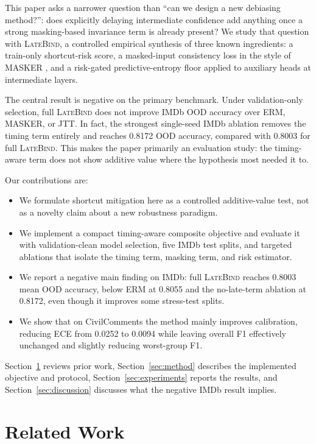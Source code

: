 \documentclass{article}
\newcommand{\LateBind}{\textsc{LateBind}}
\begin{document}
This paper asks a narrower question than ``can we design a new debiasing method?'': does explicitly delaying intermediate confidence add anything once a strong masking-based invariance term is already present? We study that question with \LateBind, a controlled empirical synthesis of three known ingredients: a train-only shortcut-risk score, a masked-input consistency loss in the style of MASKER \citep{moon-etal-2021-masker}, and a risk-gated predictive-entropy floor applied to auxiliary heads at intermediate layers.

The central result is negative on the primary benchmark. Under validation-only selection, full \LateBind{} does not improve IMDb OOD accuracy over ERM, MASKER, or JTT. In fact, the strongest single-seed IMDb ablation removes the timing term entirely and reaches 0.8172 OOD accuracy, compared with 0.8003 for full \LateBind. This makes the paper primarily an evaluation study: the timing-aware term does not show additive value where the hypothesis most needed it to.

Our contributions are:
\begin{itemize}
  \item We formulate shortcut mitigation here as a controlled additive-value test, not as a novelty claim about a new robustness paradigm.
  \item We implement a compact timing-aware composite objective and evaluate it with validation-clean model selection, five IMDb test splits, and targeted ablations that isolate the timing term, masking term, and risk estimator.
  \item We report a negative main finding on IMDb: full \LateBind{} reaches 0.8003 mean OOD accuracy, below ERM at 0.8055 and the no-late-term ablation at 0.8172, even though it improves some stress-test splits.
  \item We show that on CivilComments the method mainly improves calibration, reducing ECE from 0.0252 to 0.0094 while leaving overall F1 effectively unchanged and slightly reducing worst-group F1.
\end{itemize}

Section~\ref{sec:related} reviews prior work, Section~\ref{sec:method} describes the implemented objective and protocol, Section~\ref{sec:experiments} reports the results, and Section~\ref{sec:discussion} discusses what the negative IMDb result implies.

\section{Related Work}
\label{sec:related}
\end{document}
